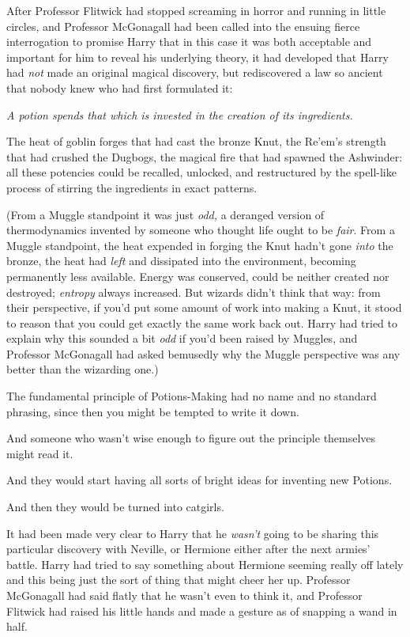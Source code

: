 After Professor Flitwick had stopped screaming in horror and running in
little circles, and Professor McGonagall had been called into the
ensuing fierce interrogation to promise Harry that in this case it was
both acceptable and important for him to reveal his underlying theory,
it had developed that Harry had \emph{not} made an original magical
discovery, but rediscovered a law so ancient that nobody knew who had
first formulated it:

\emph{A potion spends that which is invested in the creation of its
ingredients.}

The heat of goblin forges that had cast the bronze Knut, the Re'em's
strength that had crushed the Dugbogs, the magical fire that had spawned
the Ashwinder: all these potencies could be recalled, unlocked, and
restructured by the spell-like process of stirring the ingredients in
exact patterns.

(From a Muggle standpoint it was just \emph{odd,} a deranged version of
thermodynamics invented by someone who thought life ought to be
\emph{fair}. From a Muggle standpoint, the heat expended in forging the
Knut hadn't gone \emph{into} the bronze, the heat had \emph{left} and
dissipated into the environment, becoming permanently less available.
Energy was conserved, could be neither created nor destroyed;
\emph{entropy} always increased. But wizards didn't think that way: from
their perspective, if you'd put some amount of work into making a Knut,
it stood to reason that you could get exactly the same work back out.
Harry had tried to explain why this sounded a bit \emph{odd} if you'd
been raised by Muggles, and Professor McGonagall had asked bemusedly why
the Muggle perspective was any better than the wizarding one.)

The fundamental principle of Potions-Making had no name and no standard
phrasing, since then you might be tempted to write it down.

And someone who wasn't wise enough to figure out the principle
themselves might read it.

And they would start having all sorts of bright ideas for inventing new
Potions.

And then they would be turned into catgirls.

It had been made very clear to Harry that he \emph{wasn't} going to be
sharing this particular discovery with Neville, or Hermione either after
the next armies' battle. Harry had tried to say something about Hermione
seeming really off lately and this being just the sort of thing that
might cheer her up. Professor McGonagall had said flatly that he wasn't
even to think it, and Professor Flitwick had raised his little hands and
made a gesture as of snapping a wand in half.

